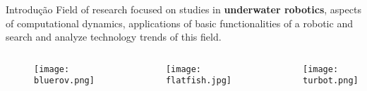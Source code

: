 \begin{frame}[t]{Introdução} 
    \transdissolve[duration=0.5]
    Field of research focused on studies in \textbf{underwater robotics}, aspects of computational dynamics, applications of basic functionalities of a robotic and search and analyze technology trends of this field.

   
        \begin{columns}[t]
            
            \begin{center}
            \begin{figure}
                \texttt{[image: bluerov.png]}
               
               
                  
               
            \end{figure}

            \end{center}
            \vspace*{0.6cm}
            \begin{center}
          
                \begin{figure}
                    
                    \texttt{[image: flatfish.jpg]}
                \end{figure}
            \end{center}
            
            \begin{center}
            \vspace*{0.4cm}
            \begin{figure}
                \texttt{[image: turbot.png]}
            \end{figure}
            \end{center}
        \end{columns}
\end{frame}
